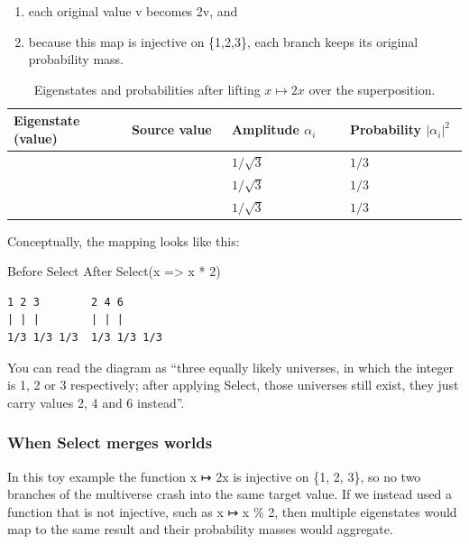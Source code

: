 \documentclass[a4paper,11pt]{article}
\begin{document}
\begin{enumerate}
\def\labelenumi{\arabic{enumi}.}
\item
  each original value v becomes 2v, and
\item
  because this map is injective on \{1,2,3\}, each branch keeps its original probability mass.
\end{enumerate}
\begin{table}[htbp]
  \centering
  \begin{tabular}{@{}
    >{\raggedright\arraybackslash}p{0.26\linewidth}
    >{\raggedright\arraybackslash}p{0.22\linewidth}
    >{\raggedright\arraybackslash}p{0.26\linewidth}
    >{\raggedright\arraybackslash}p{0.26\linewidth}@{}}
    \toprule
    \textbf{Eigenstate (value)} &
    \textbf{Source value} &
    \textbf{Amplitude $\alpha_i$} &
    \textbf{Probability $|\alpha_i|^2$} \\
    \midrule
    2 & 1 & $1/\sqrt{3}$ & $1/3$ \\
    4 & 2 & $1/\sqrt{3}$ & $1/3$ \\
    6 & 3 & $1/\sqrt{3}$ & $1/3$ \\
    \bottomrule
  \end{tabular}
  \caption{Eigenstates and probabilities after lifting $x \mapsto 2x$ over the superposition.}
  \label{tab:select-double}
\end{table}

Conceptually, the mapping looks like this:

Before Select After Select(x =\textgreater{} x * 2)

\begin{lstlisting}[style=codeblock]
1 2 3        2 4 6
| | |        | | |
1/3 1/3 1/3  1/3 1/3 1/3
\end{lstlisting}

You can read the diagram as ``three equally likely universes, in which the integer is 1, 2 or 3 respectively; after applying Select, those universes still exist, they just carry values 2, 4 and 6 instead''.

\subsubsection{When Select merges worlds}

In this toy example the function x ↦ 2x is injective on \{1, 2, 3\}, so no two branches of the multiverse crash into the same target value. If we instead used a function that is not injective, such as x ↦ x \% 2, then multiple eigenstates would map to the same result and their probability masses would aggregate.
\end{document}
